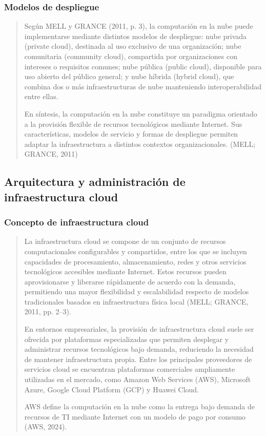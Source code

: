 \documentclass[
]{article}
\begin{document}
\subsubsection{Modelos de despliegue}\label{modelos-de-despliegue}

\begin{quote}
Según MELL y GRANCE (2011, p. 3), la computación en la nube puede
implementarse mediante distintos modelos de despliegue: nube privada
(private cloud), destinada al uso exclusivo de una organización; nube
comunitaria (community cloud), compartida por organizaciones con
intereses o requisitos comunes; nube pública (public cloud), disponible
para uso abierto del público general; y nube híbrida (hybrid cloud), que
combina dos o más infraestructuras de nube manteniendo interoperabilidad
entre ellas.

En síntesis, la computación en la nube constituye un paradigma orientado
a la provisión flexible de recursos tecnológicos mediante Internet. Sus
características, modelos de servicio y formas de despliegue permiten
adaptar la infraestructura a distintos contextos organizacionales.
(MELL; GRANCE, 2011)
\end{quote}

\subsection{Arquitectura y administración de infraestructura
cloud}\label{arquitectura-y-administraciuxf3n-de-infraestructura-cloud}

\subsubsection{Concepto de infraestructura
cloud}\label{concepto-de-infraestructura-cloud}

\begin{quote}
La infraestructura cloud se compone de un conjunto de recursos
computacionales configurables y compartidos, entre los que se incluyen
capacidades de procesamiento, almacenamiento, redes y otros servicios
tecnológicos accesibles mediante Internet. Estos recursos pueden
aprovisionarse y liberarse rápidamente de acuerdo con la demanda,
permitiendo una mayor flexibilidad y escalabilidad respecto de modelos
tradicionales basados en infraestructura física local (MELL; GRANCE,
2011, pp. 2--3).

En entornos empresariales, la provisión de infraestructura cloud suele
ser ofrecida por plataformas especializadas que permiten desplegar y
administrar recursos tecnológicos bajo demanda, reduciendo la necesidad
de mantener infraestructura propia. Entre los principales proveedores de
servicios cloud se encuentran plataformas comerciales ampliamente
utilizadas en el mercado, como Amazon Web Services (AWS), Microsoft
Azure, Google Cloud Platform (GCP) y Huawei Cloud.

AWS define la computación en la nube como la entrega bajo demanda de
recursos de TI mediante Internet con un modelo de pago por consumo (AWS,
2024).
\end{quote}
\end{document}
